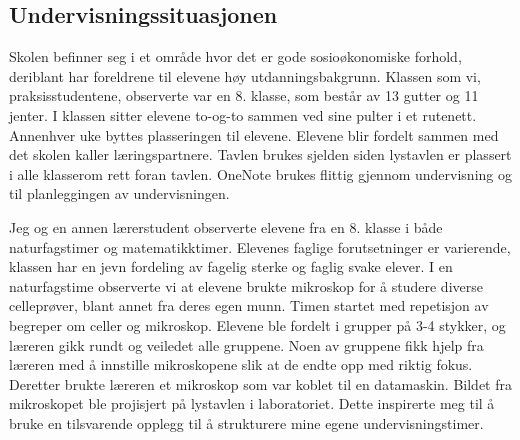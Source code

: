 \documentclass[main.tex]{subfiles}
\begin{document}
\subsection*{Undervisningssituasjonen}
Skolen befinner seg i et område hvor det er gode sosioøkonomiske forhold, deriblant har foreldrene 
til elevene høy utdanningsbakgrunn. Klassen som vi, praksisstudentene, observerte var en 8. klasse, 
som består av 13 gutter og 11 jenter. I klassen sitter elevene to-og-to sammen ved sine pulter i et 
rutenett. Annenhver uke byttes plasseringen til elevene. Elevene blir fordelt sammen med det skolen 
kaller læringspartnere. Tavlen brukes sjelden siden lystavlen er plassert i alle klasserom rett foran 
tavlen. OneNote brukes flittig gjennom undervisning og til planleggingen av undervisningen. 
\newline

Jeg og en annen lærerstudent observerte elevene fra en 8. klasse i både naturfagstimer og matematikktimer. 
Elevenes faglige forutsetninger er varierende, klassen har en jevn fordeling av fagelig 
sterke og faglig svake elever. I en naturfagstime observerte vi at elevene brukte mikroskop 
for å studere diverse celleprøver, blant annet fra deres egen munn. Timen startet med 
repetisjon av begreper om celler og mikroskop. Elevene ble fordelt i grupper på 3-4 stykker, 
og læreren gikk rundt og veiledet alle gruppene. Noen av gruppene fikk hjelp fra læreren med å innstille 
mikroskopene slik at de endte opp med riktig fokus. Deretter brukte læreren et mikroskop som var koblet til en datamaskin. 
Bildet fra mikroskopet ble projisjert på lystavlen i laboratoriet. Dette inspirerte meg til å bruke en tilsvarende 
opplegg til å strukturere mine egene undervisningstimer. 

\end{document}
